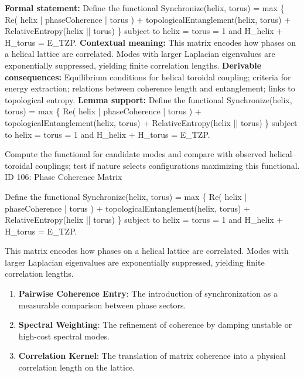 \begingroup\footnotesize\setlength{\emergencystretch}{3em}\sloppy
\textbf{Formal statement:} Define the functional Synchronize(helix, torus) = max \{ Re( helix | phaseCoherence | torus ) + topologicalEntanglement(helix, torus) + RelativeEntropy(helix || torus) \} subject to  helix  =  torus  = 1 and H\_helix + H\_torus = E\_TZP.
\textbf{Contextual meaning:} This matrix encodes how phases on a helical lattice are correlated. Modes with larger Laplacian eigenvalues are exponentially suppressed, yielding finite correlation lengths.
\textbf{Derivable consequences:} Equilibrium conditions for helical toroidal coupling; criteria for energy extraction; relations between coherence length and entanglement; links to topological entropy.
\textbf{Lemma support:} Define the functional Synchronize(helix, torus) = max \{ Re( helix | phaseCoherence | torus ) + topologicalEntanglement(helix, torus) + RelativeEntropy(helix || torus) \} subject to  helix  =  torus  = 1 and H\_helix + H\_torus = E\_TZP.\par
\endgroup

Compute the functional for candidate modes and compare with observed helical--toroidal couplings; test if nature selects configurations maximizing this functional. ID 106: Phase Coherence Matrix

Define the functional Synchronize(helix, torus) = max \{ Re( helix | phaseCoherence | torus ) + topologicalEntanglement(helix, torus) + RelativeEntropy(helix || torus) \} subject to  helix  =  torus  = 1 and H\_helix + H\_torus = E\_TZP.

This matrix encodes how phases on a helical lattice are correlated. Modes with larger Laplacian eigenvalues are exponentially suppressed, yielding finite correlation lengths.
\endgroup

\begin{enumerate}[leftmargin=1.6em,itemsep=6pt,topsep=4pt]
\item \textbf{Pairwise Coherence Entry}: The introduction of synchronization as a measurable comparison between phase sectors.
\item \textbf{Spectral Weighting}: The refinement of coherence by damping unstable or high-cost spectral modes.
\item \textbf{Correlation Kernel}: The translation of matrix coherence into a physical correlation length on the lattice.
\end{enumerate}

